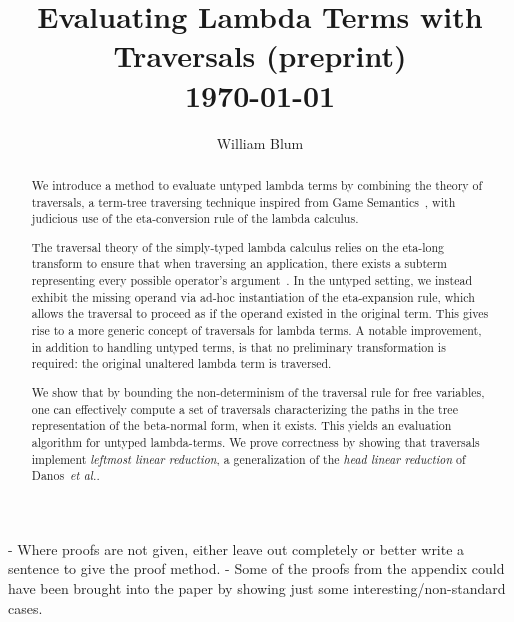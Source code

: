 \documentclass{elsarticle}
\author{William Blum}
\title{Evaluating Lambda Terms with Traversals (preprint)
\\ \vspace*{1em}
\today}
\makeatletter
\theoremstyle{plain}
\theoremstyle{definition}
\theoremstyle{remark}
\def\etal{\textit{et al.}\@\xspace}
\makeatother
\begin{document}
\begin{abstract}
    We introduce a method to evaluate untyped lambda terms by combining the theory of traversals, a term-tree traversing technique inspired from Game Semantics~\cite{OngLics2006,BlumPhd}, with judicious use of the eta-conversion rule of the lambda calculus.

    The traversal theory of the simply-typed lambda calculus relies on the eta-long transform to ensure that when traversing an application, there exists a subterm representing every possible operator's argument~\cite{BlumPhd, OngLics2006}. In the untyped setting, we instead exhibit the missing operand via ad-hoc instantiation of the eta-expansion rule, which allows the traversal to proceed as if the operand existed in the original term. This gives rise to a more generic concept of traversals for lambda terms. A notable improvement, in addition to handling untyped terms, is that no preliminary transformation is required: the original unaltered lambda term is traversed.


    We show that by bounding the non-determinism of the traversal rule for free variables, one can effectively compute a set of traversals characterizing the paths in the tree representation of the beta-normal form, when it exists. This yields an evaluation algorithm for untyped lambda-terms. We prove correctness by showing that traversals implement \emph{leftmost linear reduction}, a generalization of the \emph{head linear reduction} of Danos~\etal \cite{danos-head,danosherbelinregnier1996}.
\end{abstract}

\maketitle


\begin{todobox}
    -	Where proofs are not given, either leave out completely or better  write a sentence to give the proof method.
    -	Some of the proofs from the appendix could have been brought into
    the paper by showing just some interesting/non-standard cases.
\end{todobox}
\end{document}
